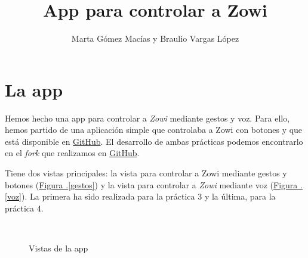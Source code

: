 \documentclass[10pt,a4paper,spanish]{article}
\title{\bf \textcolor{denim}{App para controlar a Zowi}}
\author{Marta Gómez Macías y Braulio Vargas López}
\begin{document}
\maketitle

\tableofcontents

\section{\textcolor{denim}La app}
Hemos hecho una app para controlar a \textit{\textcolor{denim}{Zowi}} mediante gestos y voz. Para ello, hemos partido de una aplicación simple que controlaba a Zowi con botones y que está disponible en \href{https://github.com/jalucenyo/ZowiApp3D}{GitHub}. El desarrollo de ambas prácticas podemos encontrarlo en el \textit{fork} que realizamos en \href{https://github.com/mgmacias95/ZowiApp3D}{GitHub}.

Tiene dos vistas principales: la vista para controlar a Zowi mediante gestos y botones (\hyperref[gestos]{Figura \thesection .\ref*{gestos}}) y la vista para controlar a \textit{\textcolor{denim}{Zowi}} mediante voz (\hyperref[voz]{Figura \thesection .\ref*{voz}}). La primera ha sido realizada para la práctica 3 y la última, para la práctica 4.

\begin{figure}[!h]
    \centering
    \mbox{
    }
    \caption{Vistas de la app}
    \label{vistas}
\end{figure}
\end{document}
